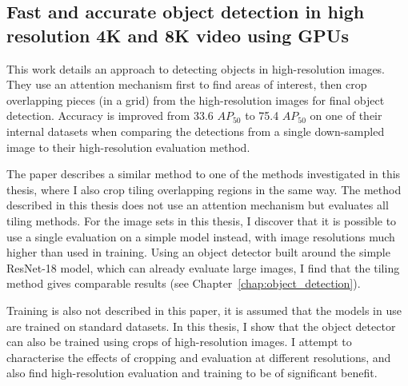 \subsection{Fast and accurate object detection in high resolution 4K and 8K video using GPUs \texorpdfstring{\cite{Ruzicka2018}}{}}

This work details an approach to detecting objects in high-resolution images. They use an attention mechanism first to find areas of interest, then crop overlapping pieces (in a grid) from the high-resolution images for final object detection. Accuracy is improved from 33.6 $AP_{50}$ to 75.4 $AP_{50}$ on one of their internal datasets when comparing the detections from a single down-sampled image to their high-resolution evaluation method. 

The paper describes a similar method to one of the methods investigated in this thesis, where I also crop tiling overlapping regions in the same way. The method described in this thesis does not use an attention mechanism but evaluates all tiling methods. For the image sets in this thesis, I discover that it is possible to use a single evaluation on a simple model instead, with image resolutions much higher than used in training. Using an object detector built around the simple ResNet-18 model, which can already evaluate large images,  I find that the tiling method gives comparable results (see Chapter~\ref{chap:object_detection}).
 
Training is also not described in this paper, it is assumed that the models in use are trained on standard datasets. In this thesis, I show that the object detector can also be trained using crops of high-resolution images. I attempt to characterise the effects of cropping and evaluation at different resolutions, and also find high-resolution evaluation and training to be of significant benefit.
